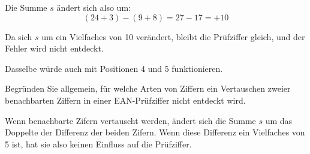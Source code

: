 \begin{myexercise}
\begin{myanswer}
		Die Summe \(s\) ändert sich also um:
		\[
			(24 + 3) - (9 + 8) = 27 - 17 = +10
		\]

		Da sich \(s\) um ein Vielfaches von 10 verändert, bleibt die Prüfziffer gleich, und der Fehler wird nicht entdeckt.

		Dasselbe würde auch mit Positionen 4 und 5 funktionieren.
	\end{myanswer}

	\begin{mychallenge}
		Begründen Sie allgemein, für welche Arten von Ziffern ein Vertauschen zweier benachbarten Ziffern in einer \gls{EAN}-Prüfziffer nicht entdeckt wird.
		\begin{myanswer}
			Wenn benachbarte Zifern vertauscht werden, ändert sich die Summe \(s\) um das
			Doppelte der Differenz der beiden Zifern. Wenn diese Differenz ein Vielfaches
			von 5 ist, hat sie also keinen Einfluss auf die Prüfziffer.











		\end{myanswer}
	\end{mychallenge}

\end{myexercise}
